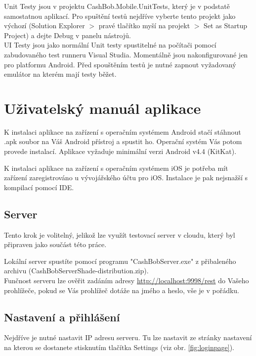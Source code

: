 Unit Testy jsou v projektu CashBob.Mobile.UnitTests, který je v podstatě samostatnou aplikací.
Pro spuštění testů nejdříve vyberte tento projekt jako výchozí (Solution Explorer $>$ pravé tlačítko myší na projekt $>$ Set as Startup Project) a dejte Debug v panelu nástrojů.\\

UI Testy jsou jako normální Unit testy spustitelné na počítači pomocí zabudovaného test runneru Visual Studia.
Momentálně jsou nakonfigurované jen pro platformu Android.
Před spouštěním testů je nutné zapnout vyžadovaný emulátor na kterém mají testy běžet.

\section{Uživatelský manuál aplikace}

K instalaci aplikace na zařízení s operačním systémem Android stačí stáhnout .apk soubor na Váš Android přístroj a spustit ho.
Operační systém Vás potom provede instalací.
Aplikace vyžaduje minimální verzi Android v4.4 (KitKat).

K instalaci aplikace na zařízení s operačním systémem iOS je potřeba mít zařízení zaregistrováno u vývojářského účtu pro iOS.
Instalace je pak nejsnažší s kompilací pomocí IDE.

\subsection{Server}

Tento krok je volitelný, jelikož lze využít testovací server v cloudu, který byl připraven jako součást této práce.

Lokální server spustíte pomocí programu "CashBobServer.exe" z přibaleného archivu (CashBobServerShade-distribution.zip). \\

Funčnost serveru lze ověřit zadáním adresy \url{http://localhost:9998/rest} do Vašeho prohlížeče, pokud se Vás prohlížeč dotáže na jmého a heslo, vše je v pořádku.

\subsection{Nastavení a přihlášení}

Nejdříve je nutné nastavit IP adresu serveru.
Tu lze nastavit ze stránky nastavení na kterou se dostanete stisknutím tlačítka Settings (viz obr. \ref{fig:loginpage}).\\


